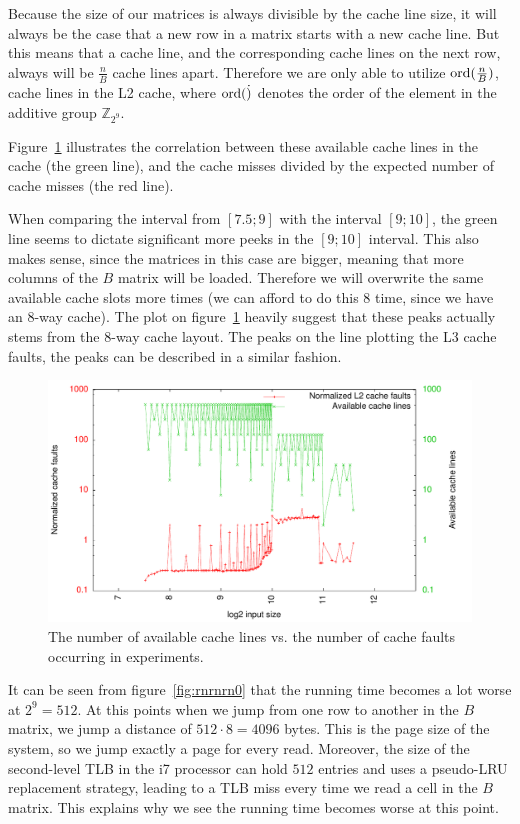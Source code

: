 Because the size of our matrices is always divisible by the cache line
size, it will always be the case that a new row in a matrix starts
with a new cache line. But this means that a cache line, and the
corresponding cache lines on the next row, always will be
$\frac{n}{B}$ cache lines apart. Therefore we are only able to utilize
$\operatorname{ord}(\frac{n}{B})$, cache lines in the L2 cache, where $\operatorname{ord}(\dot)$
denotes the order of the element in the additive group
$\mathbb{Z}_{2^9}$.

Figure~\ref{fig:rowrow_cachepeaks} illustrates the correlation between
these available cache lines in the cache (the green line), and the
cache misses divided by the expected number of cache misses (the red
line).

When comparing the interval from $[7.5; 9]$ with the interval $[9;
  10]$, the green line seems to dictate significant more peeks in the
$[9; 10]$ interval. This also makes sense, since the matrices in this
case are bigger, meaning that more columns of the $B$ matrix will be
loaded. Therefore we will overwrite the same available cache slots
more times (we can afford to do this 8 time, since we have an 8-way
cache). The plot on figure~\ref{fig:rowrow_cachepeaks} heavily suggest
that these peaks actually stems from the 8-way cache layout.  The
peaks on the line plotting the L3 cache faults, the peaks can be
described in a similar fashion.

\begin{figure}[h!]
  \centering
  \includegraphics{plots/rowrow_cachepeaks}
  \caption{The number of available cache lines vs. the number of cache
    faults occurring in experiments.}
  \label{fig:rowrow_cachepeaks}
\end{figure}

It can be seen from figure~\ref{fig:rnrnrn0} that the running time
becomes a lot worse at $2^9 = 512$. At this points when we jump from
one row to another in the $B$ matrix, we jump a distance of $512 \cdot
8 = 4096$ bytes. This is the page size of the system, so we jump
exactly a page for every read. Moreover, the size of the second-level
TLB in the i7 processor can hold $512$ entries and uses a pseudo-LRU
replacement strategy, leading to a TLB miss every time we read a cell
in the $B$ matrix. This explains why we see the running time becomes
worse at this point.

